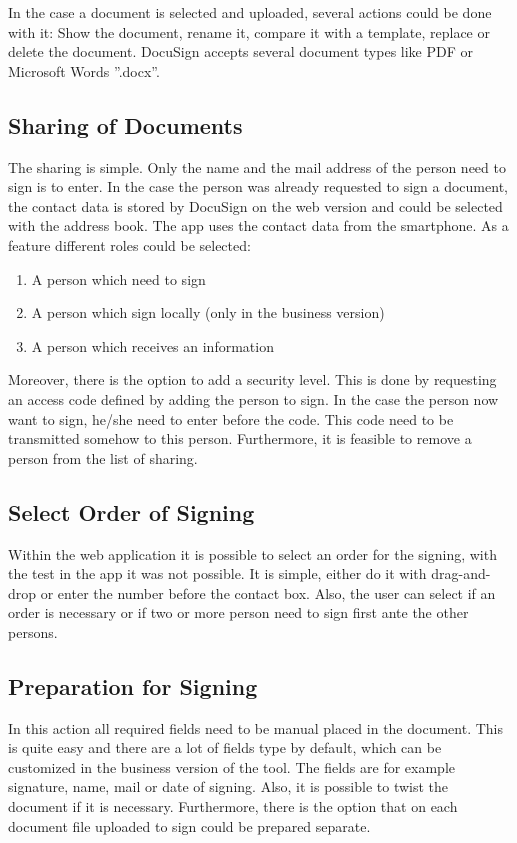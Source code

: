In the case a document is selected and uploaded, several actions could be done with it: Show the document, rename it, compare it with a template, replace or delete the document. DocuSign accepts several document types like \gls{PDF} or Microsoft Words ''.docx''.

\subsection{Sharing of Documents}
The sharing is simple. Only the name and the mail address of the person need to sign is to enter. In the case the person was already requested to sign a document, the contact data is stored by DocuSign on the web version and could be selected with the address book. The \gls{app} uses the contact data from the smartphone.
As a feature different roles could be selected:
\begin{enumerate}
	\item A person which need to sign
	\item A person which sign locally (only in the business version)
	\item A person which receives an information
\end{enumerate}
Moreover, there is the option to add a security level. This is done by requesting an access code defined by adding the person to sign. In the case the person now want to sign, he/she need to enter before the code. This code need to be transmitted somehow to this person. Furthermore, it is feasible to remove a person from the list of sharing. 

\subsection{Select Order of Signing}
Within the web application it is possible to select an order for the signing, with the test in the \gls{app} it was not possible. It is simple, either do it with drag-and-drop or enter the number before the contact box. Also, the user can select if an order is necessary or if two or more person need to sign first ante the other persons.

\subsection{Preparation for Signing}
In this action all required fields need to be manual placed in the document. This is quite easy and there are a lot of fields type by default, which can be customized in the business version of the tool. The fields are for example signature, name, mail or date of signing.
Also, it is possible to twist the document if it is necessary. Furthermore, there is the option that on each document file uploaded to sign could be prepared separate. 

